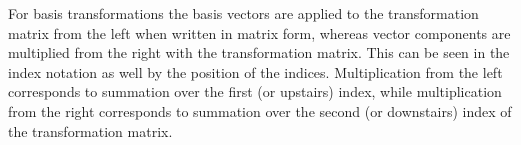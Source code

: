 For basis transformations the basis vectors are applied to the transformation matrix from
the left when written in matrix form, whereas vector components are multiplied from the
right with the transformation matrix. This can be seen in the index notation as well by
the position of the indices. Multiplication from the left corresponds to summation over
the first (or upstairs) index, while multiplication from the right corresponds to summation over the
second (or downstairs) index of the transformation matrix.

\newpage